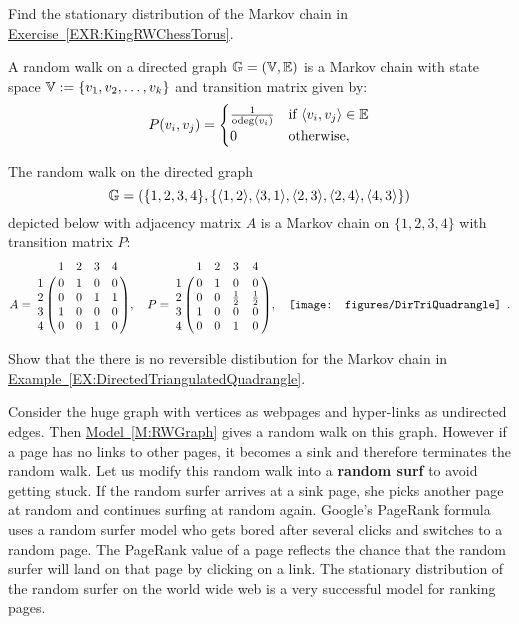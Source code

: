 \begin{exercise}\label{EXR:PiKingRWChessTorus}
Find the stationary distribution of the Markov chain in \hyperref[EXR:KingRWChessTorus]{Exercise~\ref*{EXR:KingRWChessTorus}}.
\end{exercise}

\begin{model}\label{M:RWDGraph}
A random walk on a directed graph $\mathbb{G}=(\mathbb{V},\mathbb{E})$ is a Markov chain with state space $\mathbb{V}:= \{v_1,v_2,\ldots,v_k\}$ and transition matrix given by:
\[
P(v_i,v_j) = 
\begin{cases}
\frac{1}{\operatorname{odeg}(v_i)} & \text{if $\langle v_i, v_j \rangle \in \mathbb{E}$}\\
0 & \text{otherwise} ,
\end{cases}
\]
\end{model}

\begin{example}\label{EX:DirectedTriangulatedQuadrangle}
The random walk on the directed graph 
$$\mathbb{G}=(\{1,2,3,4\}, \{\langle 1,2 \rangle, \langle 3,1 \rangle, \langle 2,3 \rangle, \langle 2,4 \rangle, \langle 4,3\rangle\})$$ depicted below with adjacency matrix $A$ is a Markov chain on $\{1,2,3,4\}$ with transition matrix $P$:
$$ 
A = 
\bordermatrix{~ & 1 & 2 & 3 & 4 \cr
1 & 0 & 1 & 0 & 0 \cr
2 & 0 & 0 & 1 & 1 \cr
3 & 1 & 0 & 0 & 0 \cr
4 & 0 & 0 & 1 & 0},
\quad
P = 
\bordermatrix{~ & 1 & 2 & 3 & 4 \cr
1 & 0 & 1 & 0 & 0 \cr
2 & 0 & 0 & \frac{1}{2} & \frac{1}{2} \cr
3 & 1 & 0 & 0 & 0 \cr
4 & 0 & 0 & 1 & 0},
\quad
\makebox{\texttt{[image: figures/DirTriQuadrangle]}}
\enspace .$$ 
\end{example}

\begin{exercise}\label{EXR:DirectedTriangulatedQuadrangleNoReversiblePi}
Show that the there is no reversible distibution for the Markov chain in \hyperref[EX:DirectedTriangulatedQuadrangle]{Example~\ref*{EX:DirectedTriangulatedQuadrangle}}. 
\end{exercise}

\begin{example}\label{EX:RandomSurferwww}
Consider the huge graph with vertices as webpages and hyper-links as undirected edges.  
Then \hyperref[M:RWGraph]{Model~\ref*{M:RWGraph}} gives a random walk on this graph.  
However if a page has no links to other pages, it becomes a sink and therefore terminates the random walk.  
Let us modify this random walk into a {\bf random surf} to avoid getting stuck.  
If the random surfer arrives at a sink page, she picks another page at random and continues surfing at random again.  
Google's PageRank formula uses a random surfer model who gets bored after several clicks and switches to a random page.  
The PageRank value of a page reflects the chance that the random surfer will land on that page by clicking on a link.  
The stationary distribution of the random surfer on the world wide web is a very successful model for ranking pages.
\end{example}

